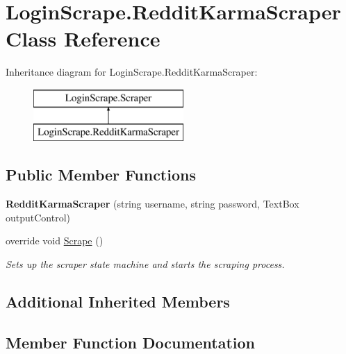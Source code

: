 \hypertarget{class_login_scrape_1_1_reddit_karma_scraper}{}\section{Login\+Scrape.\+Reddit\+Karma\+Scraper Class Reference}
\label{class_login_scrape_1_1_reddit_karma_scraper}
Inheritance diagram for Login\+Scrape.\+Reddit\+Karma\+Scraper\+:\begin{figure}[H]
\begin{center}
\leavevmode
\includegraphics[height=2.000000cm]{class_login_scrape_1_1_reddit_karma_scraper}
\end{center}
\end{figure}
\subsection*{Public Member Functions}
\begin{DoxyCompactItemize}
\item 
\hypertarget{class_login_scrape_1_1_reddit_karma_scraper_a79ebe25ea641c3e2d917074fe617c566}{}{\bfseries Reddit\+Karma\+Scraper} (string username, string password, Text\+Box output\+Control)\label{class_login_scrape_1_1_reddit_karma_scraper_a79ebe25ea641c3e2d917074fe617c566}

\item 
override void \hyperlink{class_login_scrape_1_1_reddit_karma_scraper_add1f029f1c1b7a66c7935bc99ac85df3}{Scrape} ()
\begin{DoxyCompactList}\small\item\em Sets up the scraper state machine and starts the scraping process. \end{DoxyCompactList}\end{DoxyCompactItemize}
\subsection*{Additional Inherited Members}


\subsection{Member Function Documentation}
\hypertarget{class_login_scrape_1_1_reddit_karma_scraper_add1f029f1c1b7a66c7935bc99ac85df3}{}
